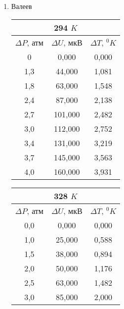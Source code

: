 \documentclass[a4paper, 12pt]{article}
\begin{document}
\begin{enumerate}
    \item Валеев
    \begin{table}[ht!]
    \begin{tabular}{|c|c|c|}
        \hline
        \multicolumn{3}{|c|}{294 $K$}                             \\ \hline
        $\Delta P$, атм & $\Delta U$, мкВ & $\Delta T$, $^{0}K$ \\ \hline
        0               & 0,000           & 0,000               \\ \hline
        1,3             & 44,000          & 1,081               \\ \hline
        1,8             & 63,000          & 1,548               \\ \hline
        2,4             & 87,000          & 2,138               \\ \hline
        2,7             & 101,000         & 2,482               \\ \hline
        3,0             & 112,000         & 2,752               \\ \hline
        3,4             & 131,000         & 3,219               \\ \hline
        3,7             & 145,000         & 3,563               \\ \hline
        4,0             & 160,000         & 3,931               \\ \hline
        \end{tabular}
    \end{table}
    \begin{table}[ht!]
        \begin{tabular}{|c|c|c|}
        \hline
        \multicolumn{3}{|c|}{328 $K$}                         \\ \hline
        $\Delta P$, атм & $\Delta U$, мкВ & $\Delta T$, $^0K$ \\ \hline
        0,0             & 0,000           & 0,000             \\ \hline
        1,0             & 25,000          & 0,588             \\ \hline
        1,5             & 38,000          & 0,894             \\ \hline
        2,0             & 50,000          & 1,176             \\ \hline
        2,5             & 63,000          & 1,482             \\ \hline
        3,0             & 85,000          & 2,000             \\ \hline

\end{tabular}
\end{table}
\end{enumerate}
\end{document}

